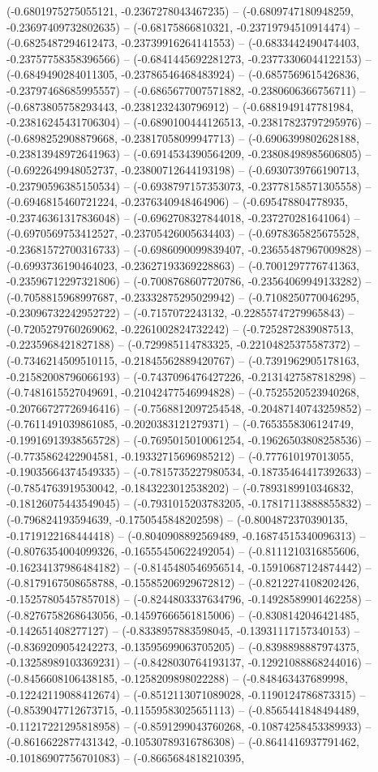 (-0.6801975275055121, -0.2367278043467235) -- (-0.6809747180948259, -0.23697409732802635) -- (-0.68175866810321, -0.23719794510914474) -- (-0.6825487294612473, -0.23739916264141553) -- (-0.6833442490474403, -0.23757758358396566) -- (-0.6841445692281273, -0.23773306044122153) -- (-0.6849490284011305, -0.23786546468483924) -- (-0.6857569615426836, -0.23797468685995557) -- (-0.6865677007571882, -0.2380606366756711) -- (-0.6873805758293443, -0.2381232430796912) -- (-0.6881949147781984, -0.23816245431706304) -- (-0.6890100444126513, -0.23817823797295976) -- (-0.6898252908879668, -0.23817058099947713) -- (-0.6906399802628188, -0.23813948972641963) -- (-0.6914534390564209, -0.23808498985606805) -- (-0.6922649948052737, -0.23800712644193198) -- (-0.6930739766190713, -0.23790596385150534) -- (-0.6938797157353073, -0.23778158571305558) -- (-0.6946815460721224, -0.2376340948464906) -- (-0.695478804778935, -0.23746361317836048) -- (-0.6962708327844018, -0.237270281641064) -- (-0.6970569753412527, -0.23705426005634403) -- (-0.6978365825675528, -0.23681572700316733) -- (-0.6986090099839407, -0.23655487967009828) -- (-0.6993736190464023, -0.23627193369228863) -- (-0.7001297776741363, -0.23596712297321806) -- (-0.7008768607720786, -0.23564069949133282) -- (-0.7058815968997687, -0.23332875295029942) -- (-0.7108250770046295, -0.23096732242952722) -- (-0.7157072243132, -0.22855747279965843) -- (-0.7205279760269062, -0.2261002824732242) -- (-0.7252872839087513, -0.2235968421827188) -- (-0.729985114783325, -0.22104825375587372) -- (-0.7346214509510115, -0.21845562889420767) -- (-0.7391962905178163, -0.21582008796066193) -- (-0.7437096476427226, -0.2131427587818298) -- (-0.7481615527049691, -0.21042477546994828) -- (-0.7525520523940268, -0.20766727726946416) -- (-0.7568812097254548, -0.20487140743259852) -- (-0.7611491039861085, -0.2020383121279371) -- (-0.7653558306124749, -0.19916913938565728) -- (-0.7695015010061254, -0.19626503808258536) -- (-0.7735862422904581, -0.19332715696985212) -- (-0.777610197013055, -0.19035664374549335) -- (-0.7815735227980534, -0.18735464417392633) -- (-0.7854763919530042, -0.1843223012538202) -- (-0.7893189910346832, -0.18126075443549045) -- (-0.7931015203783205, -0.17817113888855832) -- (-0.796824193594639, -0.1750545848202598) -- (-0.8004872370390135, -0.1719122168444418) -- (-0.8040908892569489, -0.16874515340096313) -- (-0.8076354004099326, -0.16555450622492054) -- (-0.8111210316855606, -0.16234137986484182) -- (-0.8145480546956514, -0.15910687124874442) -- (-0.8179167508658788, -0.15585206929672812) -- (-0.8212274108202426, -0.15257805457857018) -- (-0.8244803337634796, -0.14928589901462258) -- (-0.8276758268643056, -0.14597666561815006) -- (-0.8308142046421485, -0.142651408277127) -- (-0.8338957883598045, -0.13931117157340153) -- (-0.8369209054242273, -0.13595699063705205) -- (-0.8398898887974375, -0.13258989103369231) -- (-0.8428030764193137, -0.12921088868244016) -- (-0.8456608106438185, -0.1258209898022288) -- (-0.848463437689998, -0.12242119088412674) -- (-0.8512113071089028, -0.1190124786873315) -- (-0.8539047712673715, -0.11559583025651113) -- (-0.8565441848494489, -0.11217221295818958) -- (-0.8591299043760268, -0.10874258453389933) -- (-0.8616622877431342, -0.10530789316786308) -- (-0.8641416937791462, -0.10186907756701083) -- (-0.8665684818210395, 